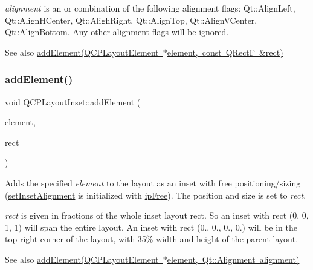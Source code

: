 {\itshape alignment} is an or combination of the following alignment flags\+: Qt\+::\+Align\+Left, Qt\+::\+Align\+H\+Center, Qt\+::\+Aligh\+Right, Qt\+::\+Align\+Top, Qt\+::\+Align\+V\+Center, Qt\+::\+Align\+Bottom. Any other alignment flags will be ignored.

\begin{DoxySeeAlso}{See also}
\mbox{\hyperlink{class_q_c_p_layout_inset_a8ff61fbee4a1f0ff45c398009d9f1e56}{add\+Element(\+Q\+C\+P\+Layout\+Element $\ast$element, const Q\+Rect\+F \&rect)}} 
\end{DoxySeeAlso}
\mbox{\label{class_q_c_p_layout_inset_a8ff61fbee4a1f0ff45c398009d9f1e56}} 
\subsubsection{\texorpdfstring{addElement()}{addElement()}\hspace{0.1cm}{\footnotesize\ttfamily [2/2]}}
{\footnotesize\ttfamily void Q\+C\+P\+Layout\+Inset\+::add\+Element (\begin{DoxyParamCaption}\item[{\mbox{\hyperlink{class_q_c_p_layout_element}{Q\+C\+P\+Layout\+Element}} $\ast$}]{element,  }\item[{const Q\+RectF \&}]{rect }\end{DoxyParamCaption})}

Adds the specified {\itshape element} to the layout as an inset with free positioning/sizing (\mbox{\hyperlink{class_q_c_p_layout_inset_a62882a4f9ad58bb0f53da12fde022abe}{set\+Inset\+Alignment}} is initialized with \mbox{\hyperlink{class_q_c_p_layout_inset_a8b9e17d9a2768293d2a7d72f5e298192aa4802986ea2cea457f932b115acba59e}{ip\+Free}}). The position and size is set to {\itshape rect}.

{\itshape rect} is given in fractions of the whole inset layout rect. So an inset with rect (0, 0, 1, 1) will span the entire layout. An inset with rect (0., 0., 0., 0.) will be in the top right corner of the layout, with 35\% width and height of the parent layout.

\begin{DoxySeeAlso}{See also}
\mbox{\hyperlink{class_q_c_p_layout_inset_ad61529eb576af7f04dff94abb10c745a}{add\+Element(\+Q\+C\+P\+Layout\+Element $\ast$element, Qt\+::\+Alignment alignment)}} 
\end{DoxySeeAlso}
\mbox{\label{class_q_c_p_layout_inset_a881ca205605bae9c034733b808f93a02}} 
